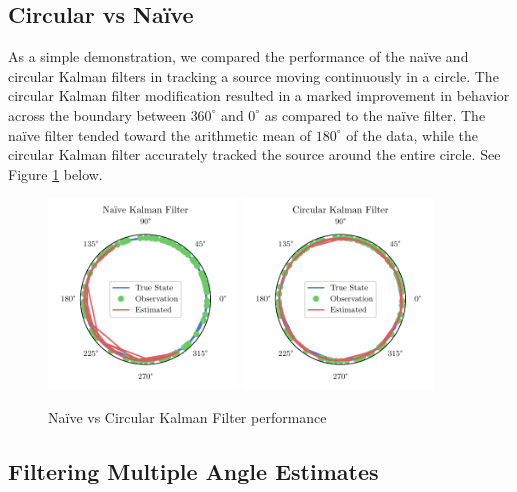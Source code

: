 \documentclass[11pt]{amsart}
\begin{document}
\subsection{Circular vs Naïve}
As a simple demonstration, we compared the performance of the naïve and circular Kalman filters in tracking a source moving continuously in a circle. The circular Kalman filter modification resulted in a marked improvement in behavior across the boundary between $360^{\circ}$ and $0^{\circ}$ as 
compared to the naïve filter. The naïve filter tended toward the arithmetic mean of $180^{\circ}$ of the data, while the circular Kalman filter accurately tracked the source around the entire circle. See Figure \ref{fig:simple_kalman} below.

\begin{figure}[htp]
    \centering
    \includegraphics[width=0.45\textwidth]{actual_paper_graphs/non_altered_kalman.pdf}\hfill
    \includegraphics[width=0.45\textwidth]{actual_paper_graphs/altered_kalman.pdf}\hfill
    \caption{Naïve vs Circular Kalman Filter performance}
    \label{fig:simple_kalman}
\end{figure}


\subsection{Filtering Multiple Angle Estimates}
\end{document}
